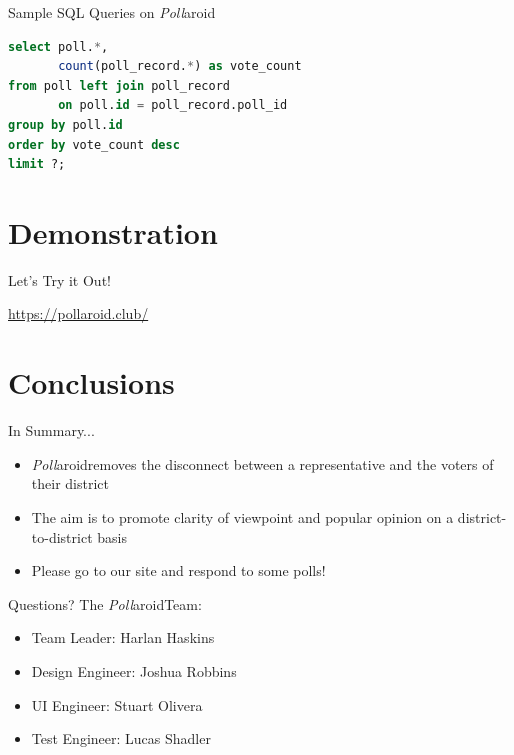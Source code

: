 \documentclass[11pt,aps,prb,groupedaddress,nofootinbib,floatfix]{beamer}
\newcommand{\pollaroid}{\emph{Poll}aroid}
\begin{document}
%
%
\begin{frame}[fragile]{Sample SQL Queries on \pollaroid}

\begin{lstlisting}[language=SQL]
select poll.*,
       count(poll_record.*) as vote_count
from poll left join poll_record
       on poll.id = poll_record.poll_id
group by poll.id
order by vote_count desc
limit ?;
\end{lstlisting}
\end{frame}

\section{Demonstration}


%
%
\begin{frame}{Let's Try it Out!}
\begin{center}
\url{https://pollaroid.club/} 
\end{center}
\end{frame}

\section{Conclusions}


%
%
\begin{frame}{In Summary...}
\begin{itemize}
	\item \pollaroid removes the disconnect between a representative and the voters of their district
	\item The aim is to promote clarity of viewpoint and popular opinion on a district-to-district basis
	\item Please go to our site and respond to some polls!
\end{itemize}
\end{frame}

\begin{frame}{Questions?}
The \pollaroid Team:
\begin{itemize}
	\item Team Leader: Harlan Haskins
	\item Design Engineer: Joshua Robbins
	\item UI Engineer: Stuart Olivera
	\item Test Engineer: Lucas Shadler
\end{itemize}
\end{frame}
\end{document}
